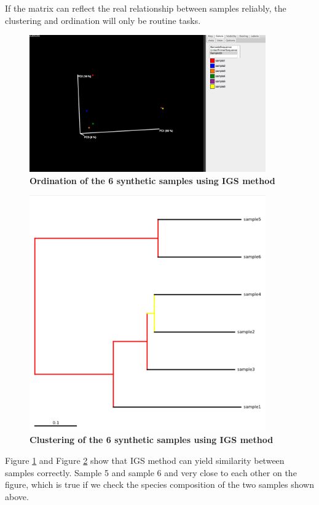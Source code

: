If the matrix can reflect the real 
relationship between samples reliably, the clustering and ordination
will only be routine tasks.


\begin{figure}[!ht]
 \centerline{\includegraphics[width=4in]{./figures/simple_PCA_3d.png}}
\caption{\bf Ordination of the 6 synthetic samples using IGS method}
\label{fig:simple_pcoa}
\end{figure}


\begin{figure}[!ht]
 \centerline{\includegraphics[width=4in]{./figures/simple_tree.png}}
\caption{\bf Clustering of the 6 synthetic samples using IGS method}
\label{fig:simple_cluster}
\end{figure}



Figure \ref{fig:simple_pcoa} and Figure \ref{fig:simple_cluster} show that 
IGS method can yield similarity between samples correctly. Sample 5 and sample 6 and very 
close to each other on the figure, which 
is true if we check the species composition of the two samples shown above.


